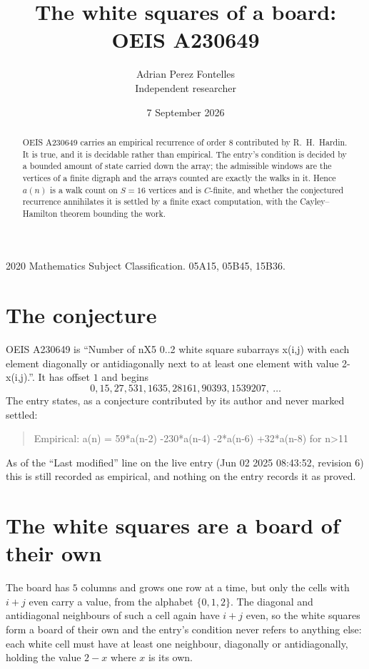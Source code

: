 \documentclass[11pt,a4paper]{article}
\title{The white squares of a board: OEIS A230649}
\author{Adrian Perez Fontelles\\ \small Independent researcher}
\date{7 September 2026}
\theoremstyle{plain}
\theoremstyle{definition}
\begin{document}
\maketitle

\begin{abstract}
OEIS A230649 carries an empirical recurrence of order $8$ contributed by R.~H.~Hardin. It is
true, and it is decidable rather than empirical. The entry's condition is decided by a bounded amount of state carried down the array; the
admissible windows are the vertices of a finite digraph and the arrays counted are exactly the
walks in it. Hence $a(n)$ is a walk count on $S=16$ vertices and is $C$-finite, and whether the
conjectured recurrence annihilates it is settled by a finite exact computation, with the
Cayley--Hamilton theorem bounding the work.
\end{abstract}

\noindent\small 2020 Mathematics Subject Classification. 05A15, 05B45, 15B36.\normalsize

\section{The conjecture}

OEIS A230649 is ``Number of nX5 0..2 white square subarrays x(i,j) with each element diagonally or antidiagonally next to at least one element with value 2-x(i,j).''. It has offset $1$ and begins
\[
0, 15, 27, 531, 1635, 28161, 90393, 1539207,\ \dots
\]
The entry states, as a conjecture contributed by its author and never marked settled:
\begin{quote}
Empirical: a(n) = 59*a(n-2) -230*a(n-4) -2*a(n-6) +32*a(n-8) for n>11
\end{quote}
As of the ``Last modified'' line on the live entry (Jun 02 2025 08:43:52, revision 6) this is still
recorded as empirical, and nothing on the entry records it as proved.

\section{The white squares are a board of their own}

The board has $5$ columns and grows one row at a time, but only the cells with $i+j$ even carry a value, from the alphabet $\{0,1,2\}$. The diagonal and antidiagonal neighbours of such a cell again have $i+j$ even, so the white squares form a board of their own and the entry's condition never refers to anything else: each white cell must have at least one neighbour, diagonally or antidiagonally, holding the value $2-x$ where $x$ is its own.
\end{document}
